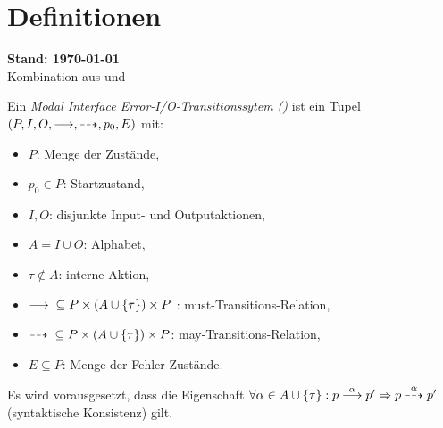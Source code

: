 \chapter{Definitionen}
{\large\textbf{Stand: \today{}}}\\

Kombination aus \cite{Vogler2016MIA3} und \cite{Schinko2016BA}

\begin{Def}
  Ein \emph{Modal Interface Error-I/O-Transitionssytem (\MEIO{})} ist ein Tupel
  $(P,I,O,\must,\may,p_0,E)$ mit:
  \begin{itemize}
    \item $P$: Menge der Zustände,
    \item $p_0\in P$: Startzustand,
    \item $I,O$: disjunkte Input- und Outputaktionen,
    \item $A = I\cup O$: Alphabet,
    \item $\tau\notin A$: interne Aktion,
    \item $\must{} \subseteq P\times (A\cup\{\tau\})\times
      P$%
      : must-Transitions-Relation,
    \item $\may{} \subseteq P\times (A\cup\{\tau\})\times
      P$: may-Transitions-Relation,
    \item $E\subseteq P$: Menge der Fehler-Zustände.
  \end{itemize}
  Es wird vorausgesetzt, dass die Eigenschaft $\forall\alpha\in
  A\cup\{\tau\}:p\must[\alpha]p' \Rightarrow p\may[\alpha]p'$
  (syntaktische Konsistenz) gilt.
\end{Def}


